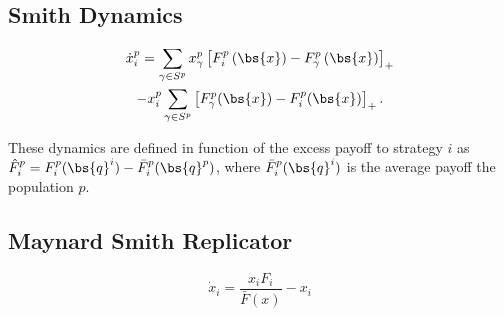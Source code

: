 \subsection{Smith Dynamics}
\begin{multline} 
\dot{x}_i^p  = \sum_{\gamma \in S^p} x_\gamma^p  \left[ F_i^p \left( \bs{x} \right) - F_\gamma^p \left( \bs{x} \right) \right]_+ 
\\
- x_i^p  \sum_{\gamma \in S^p} \left[ F_\gamma^p ( \bs{x}) - F_i^p( \bs{x} ) \right]_+.
\label{eq:smith}
\end{multline}



These dynamics are defined in function of the excess payoff to strategy $i$ as $\hat{F}_i^p =  F_i^p(\bs{q}^i) - \bar{F}_i^p(\bs{q}^p)$,
where $\bar{F}_i^p(\bs{q}^i)$ is the average payoff the population $p$.







\subsection{Maynard Smith Replicator}

\begin{equation}
\dot{x}_i = \frac{ x_i F_i }{ \bar{F}(x) } - x_i
\end{equation}


